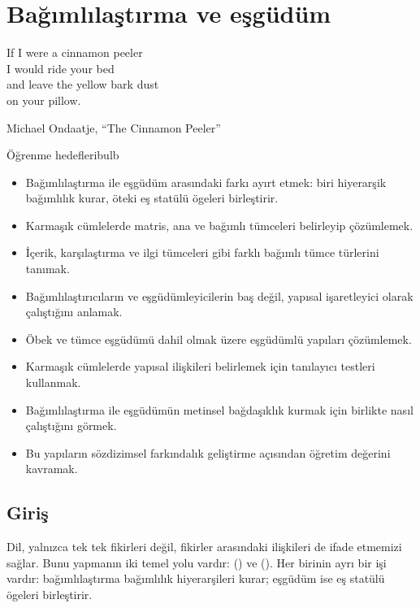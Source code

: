 \chapter{Bağımlılaştırma ve eşgüdüm} \label{ch:subord-coord-tr}

\epigraph{If I were a cinnamon peeler\\
I would ride your bed\\
and leave the yellow bark dust\\
on your pillow.}{Michael Ondaatje, \enquote{The Cinnamon Peeler}}

\begin{tblsframedsymbol}{Öğrenme hedefleri}{bulb}
\begin{itemize}[noitemsep, leftmargin=*]
    \item Bağımlılaştırma ile eşgüdüm arasındaki farkı ayırt etmek: biri hiyerarşik bağımlılık kurar, öteki eş statülü ögeleri birleştirir.
    \item Karmaşık cümlelerde matris, ana ve bağımlı tümceleri belirleyip çözümlemek.
    \item İçerik, karşılaştırma ve ilgi tümceleri gibi farklı bağımlı tümce türlerini tanımak.
    \item Bağımlılaştırıcıların ve eşgüdümleyicilerin baş değil, yapısal işaretleyici olarak çalıştığını anlamak.
    \item Öbek ve tümce eşgüdümü dahil olmak üzere eşgüdümlü yapıları çözümlemek.
    \item Karmaşık cümlelerde yapısal ilişkileri belirlemek için tanılayıcı testleri kullanmak.
    \item Bağımlılaştırma ile eşgüdümün metinsel bağdaşıklık kurmak için birlikte nasıl çalıştığını görmek.
    \item Bu yapıların sözdizimsel farkındalık geliştirme açısından öğretim değerini kavramak.
\end{itemize}
\end{tblsframedsymbol}

\section{Giriş}

Dil, yalnızca tek tek fikirleri değil, fikirler arasındaki ilişkileri de ifade etmemizi sağlar. Bunu yapmanın iki temel yolu vardır:  () ve  (). Her birinin ayrı bir işi vardır: bağımlılaştırma bağımlılık hiyerarşileri kurar; eşgüdüm ise eş statülü ögeleri birleştirir.


